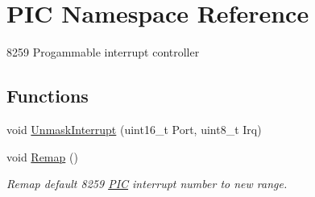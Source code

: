 \hypertarget{namespace_p_i_c}{}\section{P\+IC Namespace Reference}
\label{namespace_p_i_c}


8259 Progammable interrupt controller  


\subsection*{Functions}
\begin{DoxyCompactItemize}
\item 
void \hyperlink{namespace_p_i_c_ad6f2cca6611cd7992992ab7705d6c25f}{Unmask\+Interrupt} (uint16\+\_\+t Port, uint8\+\_\+t Irq)
\item 
void \hyperlink{namespace_p_i_c_a2a04fe95329faacc43f00ad30fe554b9}{Remap} ()
\begin{DoxyCompactList}\small\item\em Remap default 8259 \hyperlink{namespace_p_i_c}{P\+IC} interrupt number to new range. \end{DoxyCompactList}\end{DoxyCompactItemize}
